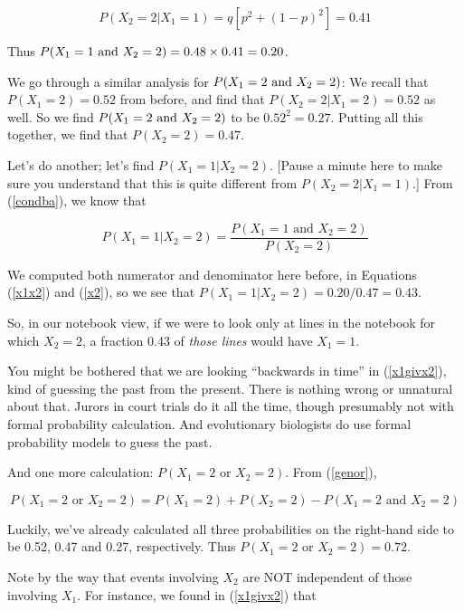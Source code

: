 \begin{equation}
P(X_2 = 2 | X_1 = 1) = q[p^2+(1-p)^2] = 0.41
\end{equation}

Thus $P(X_1 = 1 {\rm ~and~} X_2 = 2) = 0.48 \times 0.41 = 0.20$.

We go through a similar analysis for $P(X_1 = 2 {\rm ~and~} X_2 = 2)$:
We recall that $P(X_1 = 2) = 0.52$ from before, and find that $P(X_2 = 2
| X_1 = 2) = 0.52$ as well.  So we find $P(X_1 = 2 {\rm ~and~} X_2 = 2)$
to be $0.52^2 = 0.27$.  Putting all this together, we find that $P(X_2 =
2) = 0.47$.

Let's do another; let's find $P(X_1 = 1 | X_2 = 2)$.  [Pause a minute
here to make sure you understand that this is quite different from
$P(X_2 = 2 | X_1 = 1)$.] From (\ref{condba}), we know that 

\begin{equation}
\label{x1givx2}
P(X_1 = 1 | X_2 = 2) = \frac
{P(X_1 = 1 \textrm{ and } X_2 = 2)}
{P(X_2 = 2)}
\end{equation}

We computed both numerator and denominator here before, in Equations
(\ref{x1x2}) and (\ref{x2}), so we see that $P(X_1 = 1 | X_2 = 2) =
0.20/0.47 = 0.43$.

So, in our notebook view, if we were to look only at lines in the
notebook for which $X_2 = 2$, a fraction 0.43 of {\it those lines} 
would have $X_1 = 1$.

You might be bothered that we are looking ``backwards in time'' in
(\ref{x1givx2}), kind of guessing the past from the present.  There is
nothing wrong or unnatural about that.  Jurors in court trials do it all
the time, though presumably not with formal probability calculation.
And evolutionary biologists do use formal probability models to guess
the past.

And one more calculation:  $P(X_1 = 2 \textrm{ or } X_2 = 2)$.  From
(\ref{genor}), 

\begin{equation}
P(X_1 = 2 \textrm{ or } X_2 = 2) =
P(X_1 = 2) +
P(X_2 = 2) -
P(X_1 = 2 \textrm{ and } X_2 = 2) 
\end{equation}

Luckily, we've already calculated all three probabilities on the
right-hand side to be 0.52, 0.47 and 0.27, respectively.  Thus
$P(X_1 = 2 \textrm{ or } X_2 = 2) = 0.72$. 

Note by the way that events involving $X_2$ are NOT independent of those
involving $X_1$.  For instance, we found in (\ref{x1givx2}) that

